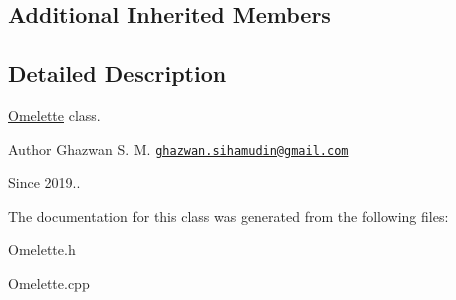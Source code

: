 \subsection*{Additional Inherited Members}


\subsection{Detailed Description}
\hyperlink{classOmelette}{Omelette} class.

\begin{DoxyAuthor}{Author}
Ghazwan S. M. \href{mailto:ghazwan.sihamudin@gmail.com}{\tt ghazwan.\+sihamudin@gmail.\+com} 
\end{DoxyAuthor}
\begin{DoxySince}{Since}
2019.. 
\end{DoxySince}


The documentation for this class was generated from the following files\+:\begin{DoxyCompactItemize}
\item 
Omelette.\+h\item 
Omelette.\+cpp\end{DoxyCompactItemize}
